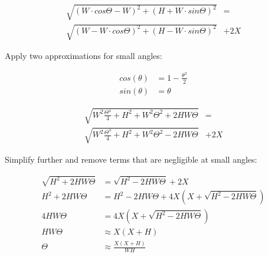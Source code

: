 \documentclass{article}
\begin{document}
\begin{align}
    \sqrt{(W\cdot cos\Theta - W)^2 + (H + W\cdot sin\Theta)^2} &= \\ 
    \sqrt{(W - W\cdot cos\Theta)^2 + (H - W\cdot sin\Theta)^2} &+ 2X
\end{align}

Apply two approximations for small angles:

\begin{align}
    cos(\theta) &= 1 - \frac{\theta^2}{2} \\
    sin(\theta) &= \theta
\end{align}

\begin{align}
    \sqrt{W^2\frac{\Theta^4}{4} + H^2 + W^2\Theta^2 + 2HW\Theta} &= \\
    \sqrt{W^2\frac{\Theta^4}{4} + H^2 + W^2\Theta^2 - 2HW\Theta} &+ 2X \nonumber
\end{align}

Simplify further and remove terms that are negligible at small angles:

\begin{align}
    \sqrt{H^2 + 2HW\Theta} &= \sqrt{H^2 - 2HW\Theta} + 2X \\
    H^2 + 2HW\Theta &= H^2 - 2HW\Theta  + 4X(X + \sqrt{H^2 - 2HW\Theta}) \\
    4HW\Theta &= 4X(X + \sqrt{H^2 - 2HW\Theta}) \\
    HW\Theta &\approx X(X + H) \\
    \Theta &\approx \frac{X(X+H)}{WH}
\end{align}
\end{document}
